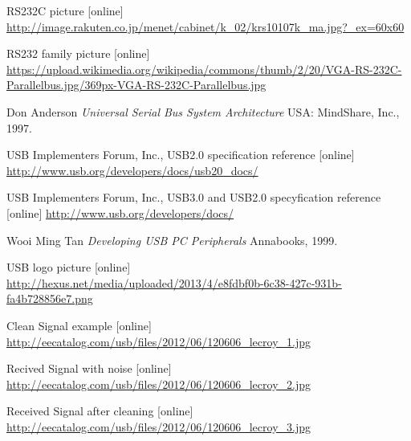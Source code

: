 \documentclass{BscUS}
\begin{document}
\newpage
\begin{thebibliography}{1}

 RS232C picture [online]
\newline
\url{http://image.rakuten.co.jp/menet/cabinet/k_02/krs10107k_ma.jpg?_ex=60x60}

 RS232 family picture [online]
\newline
\url{https://upload.wikimedia.org/wikipedia/commons/thumb/2/20/VGA-RS-232C-Parallelbus.jpg/369px-VGA-RS-232C-Parallelbus.jpg}



 Don Anderson {\em Universal Serial Bus System Architecture } USA: MindShare, Inc., 1997.

 USB Implementers Forum, Inc., USB2.0 specification reference [online] 
\newline 
\url{http://www.usb.org/developers/docs/usb20_docs/}

 USB Implementers Forum, Inc., USB3.0 and USB2.0 specyfication reference [online] 
\newline 
\url{http://www.usb.org/developers/docs/}

 Wooi Ming Tan {\em Developing USB PC Peripherals } Annabooks, 1999.

 USB logo picture [online] \\
\url{http://hexus.net/media/uploaded/2013/4/e8fdbf0b-6c38-427c-931b-fa4b728856e7.png}

 Clean Signal example [online] \\
\url{http://eecatalog.com/usb/files/2012/06/120606_lecroy_1.jpg}

 Recived Signal with noise [online] \\
\url{http://eecatalog.com/usb/files/2012/06/120606_lecroy_2.jpg}

 Received Signal after cleaning [online]\\
\url{http://eecatalog.com/usb/files/2012/06/120606_lecroy_3.jpg}



\end{thebibliography}
\end{document}
